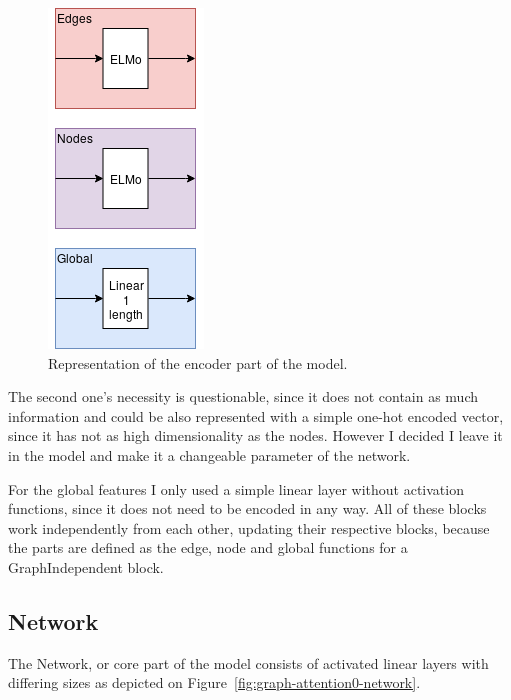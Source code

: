 \begin{figure}[!ht]
	\centering
	\includegraphics[scale=0.5]{figures/GA0_encoder.png}
	\caption{Representation of the encoder part of the model.}
	\label{fig:graph-attention0-encoder}
\end{figure}

The second one's necessity is questionable, since it does not contain as much information and could be also represented with a simple one-hot encoded vector, since it has not as high dimensionality as the nodes. However I decided I leave it in the model and make it a changeable parameter of the network.

For the global features I only used a simple linear layer without activation functions, since it does not need to be encoded in any way. All of these blocks work independently from each other, updating their respective blocks, because the parts are defined as the edge, node and global functions for a GraphIndependent block.

\subsection{Network}

The Network, or core part of the model consists of activated linear layers with differing sizes as depicted on Figure~\ref{fig:graph-attention0-network}.

